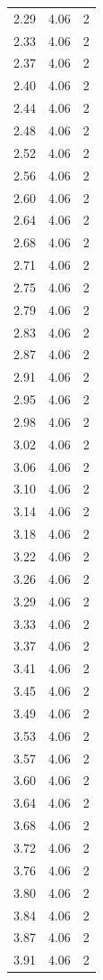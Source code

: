 \begin{longtable}{lrr}
  2.29 & 4.06 & 2 \\
  2.33 & 4.06 & 2 \\
  2.37 & 4.06 & 2 \\
  2.40 & 4.06 & 2 \\
  2.44 & 4.06 & 2 \\
  2.48 & 4.06 & 2 \\
  2.52 & 4.06 & 2 \\
  2.56 & 4.06 & 2 \\
  2.60 & 4.06 & 2 \\
  2.64 & 4.06 & 2 \\
  2.68 & 4.06 & 2 \\
  2.71 & 4.06 & 2 \\
  2.75 & 4.06 & 2 \\
  2.79 & 4.06 & 2 \\
  2.83 & 4.06 & 2 \\
  2.87 & 4.06 & 2 \\
  2.91 & 4.06 & 2 \\
  2.95 & 4.06 & 2 \\
  2.98 & 4.06 & 2 \\
  3.02 & 4.06 & 2 \\
  3.06 & 4.06 & 2 \\
  3.10 & 4.06 & 2 \\
  3.14 & 4.06 & 2 \\
  3.18 & 4.06 & 2 \\
  3.22 & 4.06 & 2 \\
  3.26 & 4.06 & 2 \\
  3.29 & 4.06 & 2 \\
  3.33 & 4.06 & 2 \\
  3.37 & 4.06 & 2 \\
  3.41 & 4.06 & 2 \\
  3.45 & 4.06 & 2 \\
  3.49 & 4.06 & 2 \\
  3.53 & 4.06 & 2 \\
  3.57 & 4.06 & 2 \\
  3.60 & 4.06 & 2 \\
  3.64 & 4.06 & 2 \\
  3.68 & 4.06 & 2 \\
  3.72 & 4.06 & 2 \\
  3.76 & 4.06 & 2 \\
  3.80 & 4.06 & 2 \\
  3.84 & 4.06 & 2 \\
  3.87 & 4.06 & 2 \\
  3.91 & 4.06 & 2 \\

\end{longtable}
